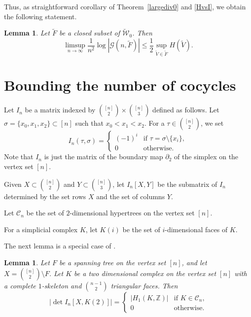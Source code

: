 \documentclass[11pt,a4paper]{article}
\theoremstyle{plain}
\newtheorem{lemma}[theorem]{Lemma}
\theoremstyle{definition}
\begin{document}
Thus, as straightforward corollary of Theorem~\ref{largediv0} and \eqref{HvsI}, we obtain the following statement.
\begin{lemma}\label{logcount}
Let $\widetilde{F}$ be a closed subset of $\widetilde{\mathcal{W}}_0$. Then
\[\limsup_{n\to\infty} \frac{1}{n^2}\log |\mathcal{G}(n,\widetilde{F})|\le \frac{1}2\sup_{\widetilde{V}\in \widetilde{F}} H(\widetilde{V}).\]

\end{lemma}

\section{Bounding the number of cocycles}

Let $I_{n}$ be a matrix indexed by ${{[n]}\choose {2}}\times {{[n]}\choose{3}}$ defined as follows. Let $\sigma=\{x_0,x_1,x_2\}\subset [n]$ such that $x_0<x_1<x_2$. For a $\tau\in {{[n]}\choose {2}}$, we set
\[I_{n}(\tau,\sigma)=\begin{cases}
(-1)^i&\text{if }\tau=\sigma\setminus\{x_i\},\\
0&\text{otherwise.}
\end{cases}
\]  
Note that $I_{n}$ is just the matrix of the boundary map $\partial_2$ of the simplex on the vertex set $[n]$.

Given $X\subset {{[n]}\choose {2}}$ and $Y\subset {{[n]}\choose {3}}$, let $I_n[X,Y]$ be the submatrix of $I_n$ determined by the set rows $X$ and the set of columns $Y$.

Let $\mathcal{C}_n$ be the set of $2$-dimensional hypertrees on the vertex set $[n]$.

For a simplicial complex $K$, let $K(i)$ be the set of $i$-dimensional faces of $K$.

The next lemma is a special case of \cite[Proposition 4.2]{duval2009simplicial}.
\begin{lemma}\label{detH}
Let $F$ be a spanning tree on the vertex set $[n]$, and let $X={{[n]}\choose {2}}\setminus F$. Let $K$ be a two dimensional complex on the vertex set $[n]$ with a complete $1$-skeleton and ${{n-1}\choose 2}$ triangular faces. Then
\[\left|\det I_n[X,K(2)]\right|=\begin{cases}
|H_1(K,\mathbb{Z})|&\text{if $K\in \mathcal{C}_n$,}\\
0&\text{otherwise.}
\end{cases}\]

\end{lemma}
\end{document}
